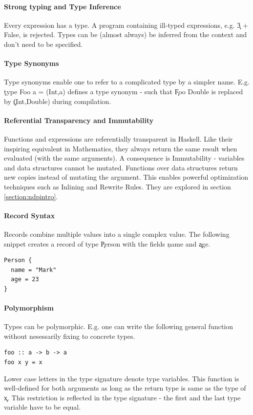   \paragraph{Strong typing and Type Inference}
    Every expression has a type. A program containing
    ill-typed expressions, e.g. \c{3 + False}, is rejected.
    Types can be (almost always) be inferred from the context and
    don't need to be specified.
    
  \paragraph{Type Synonyms}
    Type synonyms enable one to refer to a complicated type by a simpler name.
    E.g. \c{type Foo a = (Int,a)} defines a type synonym - such that
    \c{Foo Double} is replaced by \c{(Int,Double)} during compilation.
  
  \paragraph{Referential Transparency and Immutability}
    Functions and expressions are referentially transparent in Haskell.
    Like their inspiring equivalent in Mathematics, they always return
    the same result when evaluated (with the same arguments).
    A consequence is Immutability - variables and data structures
    cannot be mutated. Functions over data structures return
    new copies instead of mutating the argument. This enables
    powerful optimization techniques such as Inlining and Rewrite Rules.
    They are explored in section \ref{section:ndpintro}.
    
  \paragraph{Record Syntax}
    Records combine multiple values into a single complex value.
    The following snippet creates a record of type \c{Person} with the
    fields \c{name} and \c{age}.
    \begin{lstlisting}
Person {
  name = "Mark"
  age = 23
}
    \end{lstlisting}
    
  \paragraph{Polymorphism}
    Types can be polymorphic. 
    E.g. one can write the following general function
    without nesessarily fixing to concrete types.
    \begin{lstlisting}
foo :: a -> b -> a
foo x y = x
    \end{lstlisting}
    Lower case letters in the type signature denote type variables.
    This function is well-defined for both arguments
    as long as the return type is same as the type of \c{x}. This
    restriction is reflected in the type signature - the first and
    the last type variable have to be equal. 
    
